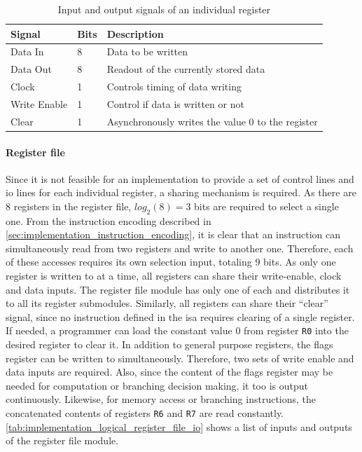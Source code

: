 \begin{table}[H]
    \centering
    \begin{tabular}{|l|l|l|} 
        \hline
        \textbf{\textbf{Signal}} & \textbf{Bits}           & \textbf{Description}                               \\ 
        \hline
        Data In                  & 8                       & Data to be written                                 \\ 
        \hline
        Data Out                 & 8                       & Readout of the currently stored data               \\ 
        \hline
        Clock                    & 1                       & Controls timing of data writing                    \\ 
        \hline
        Write Enable             & 1                       & Control if data is written or not                  \\ 
        \hline
        Clear                    & 1                       & Asynchronously writes the value 0 to the register  \\
        \hline
    \end{tabular}
    \caption{Input and output signals of an individual register}
    \label{tab:implementation_logical_register_io}
\end{table}

\paragraph*{Register file}

Since it is not feasible for an implementation to provide a set of control lines and \ac{io} lines for each individual register, a sharing mechanism is required. As there are 8 registers in the register file, $log_2(8) = 3$ bits are required to select a single one. From the instruction encoding described in \autoref{sec:implementation_instruction_encoding}, it is clear that an instruction can simultaneously read from two registers and write to another one. Therefore, each of these accesses requires its own selection input, totaling 9 bits. As only one register is written to at a time, all registers can share their write-enable, clock and data inputs. The register file module has only one of each and distributes it to all its register submodules. Similarly, all registers can share their ``clear'' signal, since no instruction defined in the \ac{isa} requires clearing of a single register. If needed, a programmer can load the constant value 0 from register \texttt{R0} into the desired register to clear it. In addition to general purpose registers, the flags register can be written to simultaneously. Therefore, two sets of write enable and data inputs are required. Also, since the content of the flags register may be needed for computation or branching decision making, it too is output continuously. Likewise, for memory access or branching instructions, the concatenated contents of registers \texttt{R6} and \texttt{R7} are read constantly. \autoref{tab:implementation_logical_register_file_io} shows a list of inputs and outputs of the register file module.

